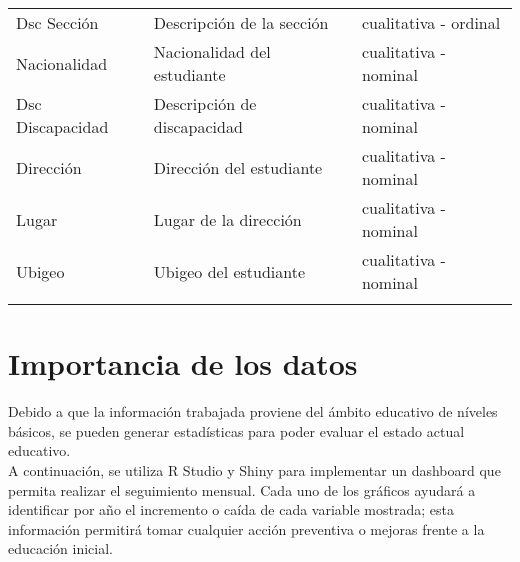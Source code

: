 \begin{table}
\begin{tabular}{l l l}
Dsc Sección & Descripción de la sección & cualitativa - ordinal\\
Nacionalidad & Nacionalidad del estudiante & cualitativa - nominal\\
Dsc Discapacidad & Descripción de discapacidad & cualitativa - nominal\\
Dirección & Dirección del estudiante & cualitativa - nominal\\
Lugar & Lugar de la dirección & cualitativa - nominal\\
Ubigeo & Ubigeo del estudiante & cualitativa - nominal\\
\bottomrule\\
\end{tabular}
\end{table}

\section{Importancia de los datos}

Debido a que la información trabajada proviene del ámbito educativo de níveles básicos, se pueden generar estadísticas para poder evaluar el estado actual educativo.\\
A continuación, se utiliza R Studio y Shiny para implementar un dashboard que permita realizar el seguimiento mensual. Cada uno de los gráficos ayudará a identificar por año el incremento o caída de cada variable mostrada; esta información permitirá tomar cualquier acción preventiva o mejoras frente a la educación inicial.